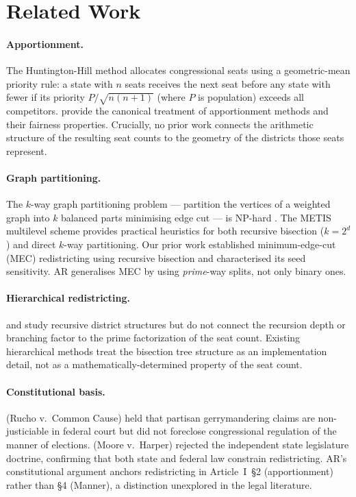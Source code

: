 \section{Related Work}
\label{sec:related}

\paragraph{Apportionment.}
The Huntington-Hill method \citep{huntington1921methods, hill1911method}
allocates congressional seats using a geometric-mean priority rule: a state
with $n$ seats receives the next seat before any state with fewer if its
priority $P / \sqrt{n(n+1)}$ (where $P$ is population) exceeds all competitors.
\citet{balinski2001fair} provide the canonical treatment of apportionment
methods and their fairness properties. Crucially, no prior work connects the
arithmetic structure of the resulting seat counts to the geometry of the
districts those seats represent.

\paragraph{Graph partitioning.}
The $k$-way graph partitioning problem --- partition the vertices of a weighted
graph into $k$ balanced parts minimising edge cut --- is NP-hard
\citep{garey1979computers}. The METIS multilevel scheme
\citep{karypis1998fast} provides practical heuristics for both recursive
bisection ($k = 2^d$) and direct $k$-way partitioning. Our prior work
\citep{dellaLibera2026mec} established minimum-edge-cut (MEC) redistricting
using recursive bisection and characterised its seed sensitivity.
AR generalises MEC by using \emph{prime}-way splits, not only binary ones.

\paragraph{Hierarchical redistricting.}
\citet{cohen2021making} and \citet{hegeman2020recursive} study recursive
district structures but do not connect the recursion depth or branching factor
to the prime factorization of the seat count. Existing hierarchical methods
treat the bisection tree structure as an implementation detail, not as a
mathematically-determined property of the seat count.

\paragraph{Constitutional basis.}
\citet{rucho2019} (Rucho v.\ Common Cause) held that partisan gerrymandering
claims are non-justiciable in federal court but did not foreclose congressional
regulation of the manner of elections. \citet{moore2023} (Moore v.\ Harper)
rejected the independent state legislature doctrine, confirming that both state
and federal law constrain redistricting. AR's constitutional argument anchors
redistricting in Article~I~\S2 (apportionment) rather than \S4 (Manner),
a distinction unexplored in the legal literature.

